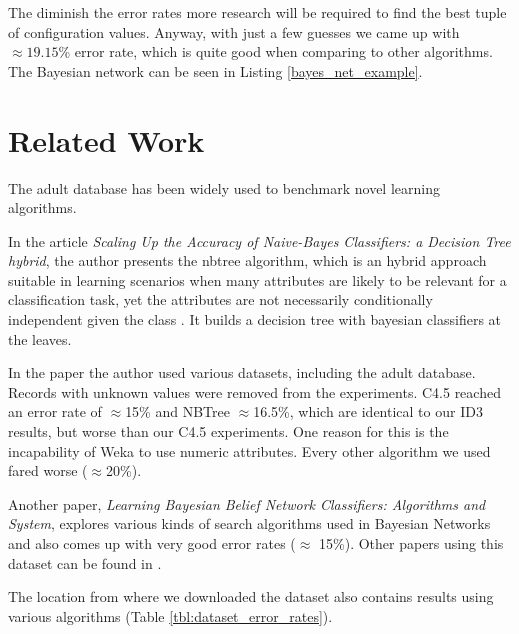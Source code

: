 \documentclass[a4paper]{llncs}
\begin{document}
The diminish the error rates more research will be required to find the best
tuple of configuration values. Anyway, with just a few guesses we came up
with $\approx19.15$\% error rate, which is quite good when comparing to other algorithms.
The Bayesian network can be seen in Listing \ref{bayes_net_example}.

\section{Related Work}

The adult database has been widely used to benchmark novel learning algorithms.

In the article \textit{Scaling Up the Accuracy of Naive-Bayes Classifiers: a Decision Tree hybrid},
the author presents the nbtree algorithm, which is an hybrid approach suitable in learning scenarios
when many attributes are likely to be relevant for a classification task, yet the attributes
are not necessarily conditionally independent given the class \cite{nbtree}. It builds
a decision tree with bayesian classifiers at the leaves.

In the paper the author used various datasets, including the adult database. Records with unknown values
were removed from the experiments. C4.5 reached an error rate of $\approx$15\% and NBTree $\approx$16.5\%,
which are identical to our ID3 results, but worse than our C4.5 experiments. One reason for this is
the incapability of Weka to use numeric attributes. Every other algorithm we used fared worse ($\approx$20\%).

Another paper, \textit{Learning Bayesian Belief Network Classifiers: Algorithms and System}, explores
various kinds of search algorithms used in Bayesian Networks and also comes up with very good error rates ($\approx$ 15\%).
Other papers using this dataset can be found in \cite{dataset_papers}.

The location from where we downloaded the dataset also contains results
using various algorithms (Table \ref{tbl:dataset_error_rates}).
\end{document}
